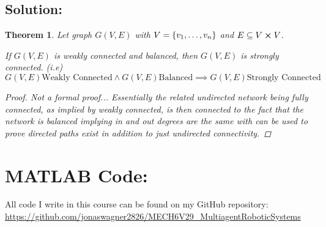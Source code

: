 \documentclass[]{article}
\numberwithin{equation}{section}
\newtheorem{theorem}{Theorem}
\begin{document}




\subsection*{Solution:}
\begin{theorem}
    Let graph $G(V,E)$ with $V = \qty{v_1,\dots,v_n}$ and $E \subseteq V \cross V$.

    If $G(V,E)$ is weakly connected and balanced, then $G(V,E)$ is strongly connected.
    (i.e)\[
        G(V,E) \text{Weakly Connected} 
            \land G(V,E) \text{Balanced}
            \implies G(V,E) \text{Strongly Connected}
    \]
    \begin{proof}
        Not a formal proof...
        Essentially the related undirected network being fully connected, as implied by weakly connected, is then connected to the fact that the network is balanced implying in and out degrees are the same with can be used to prove directed paths exist in addition to just undirected connectivity.
    \end{proof}
\end{theorem}









\newpage
\appendix
\section{MATLAB Code:}\label{apx:matlab}
All code I write in this course can be found on my GitHub repository:\\
\href{https://github.com/jonaswagner2826/MECH6V29_MultiagentRoboticSystems}{https://github.com/jonaswagner2826/MECH6V29\_MultiagentRoboticSystems}

% 

% 
\end{document}
